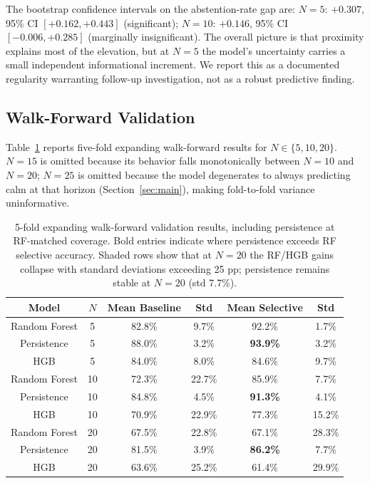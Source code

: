\documentclass[12pt]{article}
\begin{document}
The bootstrap confidence intervals on the abstention-rate gap are: $N = 5$: $+0.307$, 95\% CI $[+0.162, +0.443]$ (significant); $N = 10$: $+0.146$, 95\% CI $[-0.006, +0.285]$ (marginally insignificant). The overall picture is that proximity explains most of the elevation, but at $N = 5$ the model's uncertainty carries a small independent informational increment. We report this as a documented regularity warranting follow-up investigation, not as a robust predictive finding.

\subsection{Walk-Forward Validation}
\label{sec:wf}

Table~\ref{tab:wf} reports five-fold expanding walk-forward results for $N \in \{5, 10, 20\}$. $N = 15$ is omitted because its behavior falls monotonically between $N = 10$ and $N = 20$; $N = 25$ is omitted because the model degenerates to always predicting calm at that horizon (Section~\ref{sec:main}), making fold-to-fold variance uninformative.

\begin{table}[H]
\centering
\caption{5-fold expanding walk-forward validation results, including persistence at RF-matched coverage. Bold entries indicate where persistence exceeds RF selective accuracy. Shaded rows show that at $N = 20$ the RF/HGB gains collapse with standard deviations exceeding 25 pp; persistence remains stable at $N = 20$ (std 7.7\%).}
\label{tab:wf}
\begin{tabular}{cccccc}
\toprule
Model & $N$ & Mean Baseline & Std & Mean Selective & Std \\
\midrule
Random Forest    & 5  & 82.8\% & 9.7\%  & 92.2\% & 1.7\%  \\
Persistence      & 5  & 88.0\% & 3.2\%  & \textbf{93.9\%} & 3.2\%  \\
HGB              & 5  & 84.0\% & 8.0\%  & 84.6\% & 9.7\%  \\
\midrule
Random Forest    & 10 & 72.3\% & 22.7\% & 85.9\% & 7.7\%  \\
Persistence      & 10 & 84.8\% & 4.5\%  & \textbf{91.3\%} & 4.1\%  \\
HGB              & 10 & 70.9\% & 22.9\% & 77.3\% & 15.2\% \\
\midrule
\rowcolor[gray]{0.9}
Random Forest    & 20 & 67.5\% & 22.8\% & 67.1\% & 28.3\% \\
Persistence      & 20 & 81.5\% & 3.9\%  & \textbf{86.2\%} & 7.7\%  \\
\rowcolor[gray]{0.9}
HGB              & 20 & 63.6\% & 25.2\% & 61.4\% & 29.9\% \\
\bottomrule
\end{tabular}
\end{table}
\end{document}
